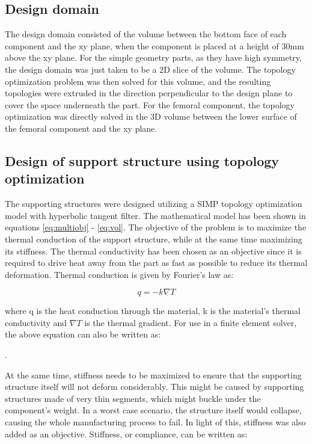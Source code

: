 \documentclass[../main.tex]{subfiles}
\begin{document}
\subsection{Design domain}

The design domain consisted of the volume between the bottom face of each component and the xy plane, when the component is placed at a height of 30mm above the xy plane. For the simple geometry parts, as they have high symmetry, the design domain was just taken to be a 2D slice of the volume. The topology optimization problem was then solved for this volume, and the resulting topologies were extruded in the direction perpendicular to the design plane to cover the space underneath the part. For the femoral component, the topology optimization was directly solved in the 3D volume between the lower surface of the femoral component and the xy plane.  

\subsection{Design of support structure using topology optimization}

The supporting structures were designed utilizing a SIMP topology optimization model with hyperbolic tangent filter. The mathematical model has been shown in equations \ref{eq:multiobj} - \ref{eq:vol}. The objective of the problem is to maximize the thermal conduction of the support structure, while at the same time maximizing its stiffness. The thermal conductivity has been chosen as an objective since it is required to drive heat away from the part as fast as possible to reduce its thermal deformation. 
Thermal conduction is given by Fourier's law as:

\begin{equation}
  \label{eq:Fourier Law}
  q = -k \nabla T
\end{equation}

where q is the heat conduction through the material, k is the material's thermal conductivity and $\nabla T$ is the thermal gradient. For use in a finite element solver, the above equation can also be written as:

.

At the same time, stiffness needs to be maximized to ensure that the supporting structure itself will not deform considerably. This might be caused by supporting structures made of very thin segments, which might buckle under the component's weight. In a worst case scenario, the structure itself would collapse, causing the whole manufacturing process to fail. In light of this, stiffness was also added as an objective. Stiffness, or compliance, can be written as:
\end{document}
